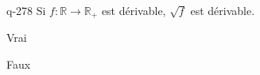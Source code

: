 \begin{truefalse}{q-278}
Si $f : \mathbb R \to \mathbb R_+$ est dérivable, $\sqrt f$ est dérivable.
\item Vrai
\item* Faux
\end{truefalse}

